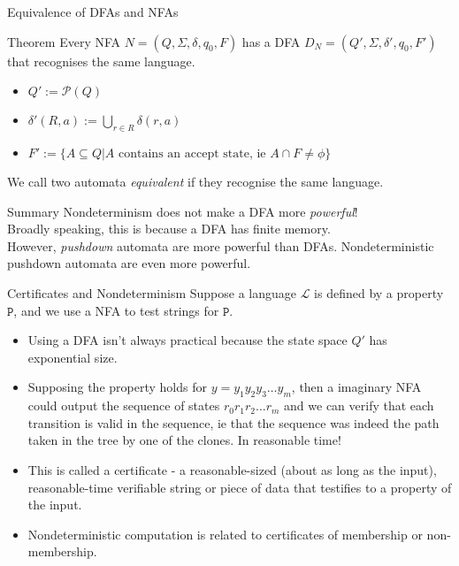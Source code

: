 \documentclass{beamer}
\begin{document}
\begin{frame}{Equivalence of DFAs and NFAs}
\begin{block}{Theorem}
Every NFA \(N= (Q, \Sigma, \delta, q_0, F)\) has a DFA \( D_N = (Q', \Sigma, \delta', q_0, F') \) that recognises the same language.
\begin{itemize}
    \item \(Q' := \mathcal{P}(Q)\)
    \item \(\delta' (R, a) := \bigcup_{r \in R} \delta (r, a)\)
    \item \(F' := \{ A \subseteq Q | A \text{ contains an accept state, ie } A \cap F \neq \phi \} \)
\end{itemize}
\end{block}
    We call two automata \emph{equivalent} if they recognise the same language.
    \pause
\begin{alertblock}{Summary}
    Nondeterminism does not make a DFA more \emph{powerful}! \\ \pause
    Broadly speaking, this is because a DFA has finite memory. \\\pause However, \emph{pushdown} automata are more powerful than DFAs. Nondeterministic pushdown automata are even more powerful.
\end{alertblock}
\end{frame}
\begin{frame}{Certificates and Nondeterminism}
Suppose a language \(\mathcal{L}\) is defined by a property \(\mathtt{P}\), and we use a NFA to test strings for \(\mathtt{P}\).\pause
\begin{itemize}
    \item Using a DFA isn't always practical because the state space \(Q'\) has exponential size.
    \item Supposing the property holds for \(y=y_1 y_2 y_3 \dots y_m\), then a imaginary NFA could output the sequence of states \(r_0 r_1 r_2 \dots r_m\) and we can verify that each transition is valid in the sequence, ie that the sequence was indeed the path taken in the tree by one of the clones. In reasonable time!
    \item This is called a certificate - a reasonable-sized (about as long as the input), reasonable-time verifiable string or piece of data that testifies to a property of the input.
    \item Nondeterministic computation is related to certificates of membership or non-membership.
\end{itemize}
\end{frame}
\end{document}
